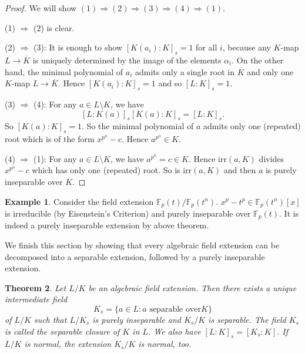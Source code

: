 \documentclass[12pt]{report}
\newtheorem{thm}{Theorem}[section]
\theoremstyle{definition}
\newtheorem{example}[thm]{Example}
\def\FF{\mathbb{F}}
\def\aa{\alpha}
\def\irr{\text{irr}}
\begin{document}
\begin{proof} 
    We will show $(1)\Longrightarrow (2) \Longrightarrow (3) \Longrightarrow (4) \Longrightarrow (1)$.


    (1) $\Longrightarrow$ (2) is clear.


    (2) $\Longrightarrow$ (3):  It is enough to show $[K(a_i):K]_s=1$ for all $i$, because any $K$-map $L\to \overline{K}$ is uniquely determined by the image of the elements $\aa_i$. On the other hand, the minimal polynomial of $a_i$ admits only a single root in $\overline{K}$ and only one $K$-map $L\to \overline{K}$. Hence $[K(a_i):K]_s=1$ and so $[L:K]_s=1$.
    
    
    (3) $\Longrightarrow$ (4): For any $a\in L\setminus K$, we have $$[L:K(a)]_s [K(a):K]_s = [L:K]_s.$$ So $[K(a):K]_s=1$. So the minimal polynomial of $a$ admits only one (repeated) root which is of the form $x^{p^n}-c$. Hence $a^{p^n}\in K$.


    (4) $\Longrightarrow$ (1):  For any $a\in L\setminus K$, we have $a^{p^n}=c\in K$. Hence $\irr(a,K)$ divides $x^{p^n}-c$ which has only one (repeated) root. So is $\irr(a,K)$ and then $a$ is purely inseparable over $K$.
\end{proof}

\begin{example}
    Consider the field extension $\FF_p(t)/\FF_p(t^n)$. $x^p-t^p\in \FF_p(t^n)[x]$ is irreducible (by Eisenstein's Criterion) and purely inseparable over $\FF_p(t)$. It is indeed a purely inseparable extension by above theorem. 
\end{example}

We finish this section by showing that every algebraic field extension can be decomposed into a separable extension, followed by a purely inseparable extension. 

\begin{thm}
    Let $L/K$ be an algebraic field extension. Then there exists a unique intermediate field $$K_s=\{a\in L:a \mbox{ separable over} K\}$$ of $L/K$ such that $L/K_s$ is purely inseparable and $K_s/K$ is separable. The field $K_s$ is called the separable closure of $K$ in $L$. We also have  $[L : K]_s = [K_s : K]$. If $L/K$ is normal, the extension $K_s/K$ is normal, too.
\end{thm}
\end{document}

